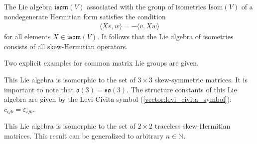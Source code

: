     \begin{example}[Isometries]\label{lie:lie_isometry}
        The Lie algebra $\mathfrak{isom}(V)$ associated with the group of isometries $\mathrm{Isom}(V)$ of a nondegenerate Hermitian form satisfies the condition
        \begin{gather}
            \langle Xv,w \rangle = -\langle v,Xw \rangle
        \end{gather}
        for all elements $X\in\mathfrak{isom}(V)$. It follows that the Lie algebra of isometries consists of all skew-Hermitian operators.
    \end{example}

    Two explicit examples for common matrix Lie groups are given.
    \begin{example}\label{lie:so3}
        This Lie algebra is isomorphic to the set of $3\times3$ skew-symmetric matrices. It is important to note that $\mathfrak{o}(3)=\mathfrak{so}(3)$. The structure constants of this Lie algebra are given by the Levi-Civita symbol (\cref{vector:levi_civita_symbol}): $c_{ijk}=\varepsilon_{ijk}$.
    \end{example}
    \begin{example}
        This Lie algebra is isomorphic to the set of $2\times2$ traceless skew-Hermitian matrices. This result can be generalized to arbitrary $n\in\mathbb{N}$.
    \end{example}

